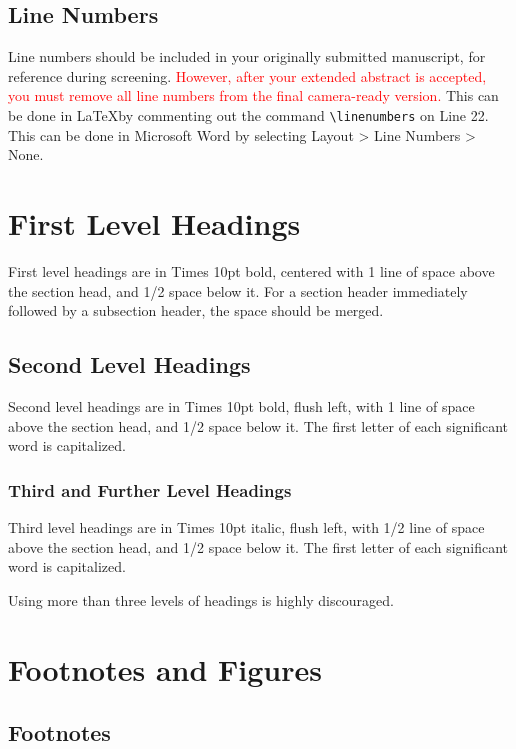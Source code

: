 \documentclass{article}
\begin{document}
\subsection{Line Numbers}

Line numbers should be included in your originally submitted manuscript, for reference during screening. \textcolor{red}{However, after your extended abstract is accepted, you must remove all line numbers from the final camera-ready version.} This can be done in \LaTeX by commenting out the command \verb|\linenumbers| on Line 22. This can be done in Microsoft Word by selecting Layout > Line Numbers > None.

\section{First Level Headings}

First level headings are in Times 10pt bold,
centered with 1 line of space above the section head, and 1/2 space below it.
For a section header immediately followed by a subsection header, the space should be merged.

\subsection{Second Level Headings}

Second level headings are in Times 10pt bold, flush left,
with 1 line of space above the section head, and 1/2 space below it.
The first letter of each significant word is capitalized.

\subsubsection{Third and Further Level Headings}

Third level headings are in Times 10pt italic, flush left,
with 1/2 line of space above the section head, and 1/2 space below it.
The first letter of each significant word is capitalized.

Using more than three levels of headings is highly discouraged.

\section{Footnotes and Figures}

\subsection{Footnotes}
\end{document}
